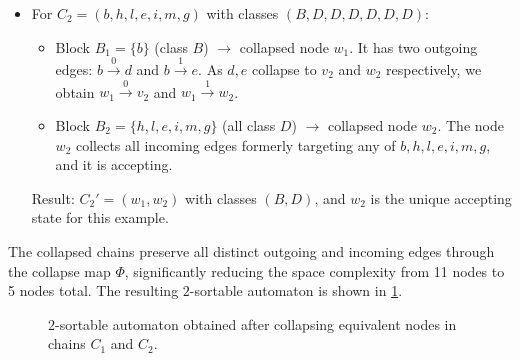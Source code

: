 \begin{example}
\begin{itemize}
        \item For $C_2 = (b,h,l,e,i,m,g)$ with classes $(B,D,D,D,D,D,D)$:
        \begin{itemize}
            \item Block $B_1 = \{b\}$ (class $B$) $\rightarrow$ collapsed node $w_1$. It has two outgoing edges: $b \xrightarrow{0} d$ and $b \xrightarrow{1} e$. As $d,e$ collapse to $v_2$ and $w_2$ respectively, we obtain $w_1 \xrightarrow{0} v_2$ and $w_1 \xrightarrow{1} w_2$.
            \item Block $B_2 = \{h,l,e,i,m,g\}$ (all class $D$) $\rightarrow$ collapsed node $w_2$. The node $w_2$ collects all incoming edges formerly targeting any of $b,h,l,e,i,m,g$, and it is accepting.
        \end{itemize}
        Result: $C_2' = (w_1, w_2)$ with classes $(B,D)$, and $w_2$ is the unique accepting state for this example.
    \end{itemize}
    
    The collapsed chains preserve all distinct outgoing and incoming edges through the collapse map $\Phi$, significantly reducing the space complexity from 11 nodes to 5 nodes total. The resulting $2$-sortable automaton is shown in \cref{fig:minimized_chains}.

    \begin{figure}[H]
        \centering
        \caption{$2$-sortable automaton obtained after collapsing equivalent nodes in chains $C_1$ and $C_2$.}
        \label{fig:minimized_chains}
    \end{figure} 
\end{example}

